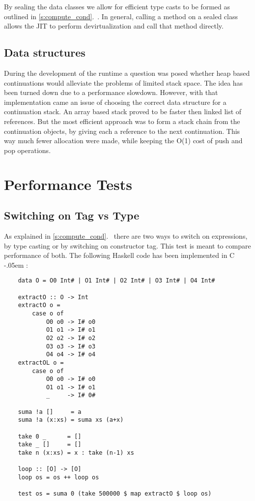 \documentclass[en]{pracamgr}
\newcommand{\shrp}{%
  {\settoheight{\dimen0}{C}\kern-.05em \resizebox{!}{\dimen0}{\raisebox{\depth}{\textbf{\#}}}\hspace{1ex}}}
\newcommand{\myref}[1]{\ref{#1}.~\nameref{#1}}
\begin{document}
By sealing the data classes we allow for efficient type casts
to be formed as outlined in \myref{s:compute_cond}.
In general, calling a method on a sealed class allows
the JIT to perform devirtualization and call that method
directly.

\subsection{Data structures}

During the development of the runtime a question was posed
whether heap based continuations would alleviate the problems
of limited stack space. The idea has been turned down
due to a performance slowdown.
However, with that implementation came an issue
of choosing the correct data structure for a continuation stack.
An array based stack proved to be faster then linked list of references.
But the most efficient approach was to form a stack chain
from the continuation objects, by giving each a reference
to the next continuation.
This way much fewer allocation were made, while keeping
the O(1) cost of push and pop operations.

\section{Performance Tests}

\subsection{Switching on Tag vs Type}\label{perf:switching}

As explained in \myref{s:compute_cond} there are two ways
to switch on expressions, by type casting or by switching
on constructor tag. This test is meant to compare
performance of both. The following Haskell code has been implemented in C\shrp:

\begin{verbatim}
    data O = O0 Int# | O1 Int# | O2 Int# | O3 Int# | O4 Int#
    
    extractO :: O -> Int
    extractO o =
        case o of
            O0 o0 -> I# o0
            O1 o1 -> I# o1
            O2 o2 -> I# o2
            O3 o3 -> I# o3
            O4 o4 -> I# o4
    extractOL o =
        case o of
            O0 o0 -> I# o0
            O1 o1 -> I# o1
            _     -> I# 0#

    suma !a []     = a
    suma !a (x:xs) = suma xs (a+x)

    take 0 _      = []
    take _ []     = []
    take n (x:xs) = x : take (n-1) xs

    loop :: [O] -> [O]
    loop os = os ++ loop os

    test os = suma 0 (take 500000 $ map extractO $ loop os)
\end{verbatim}
\end{document}

